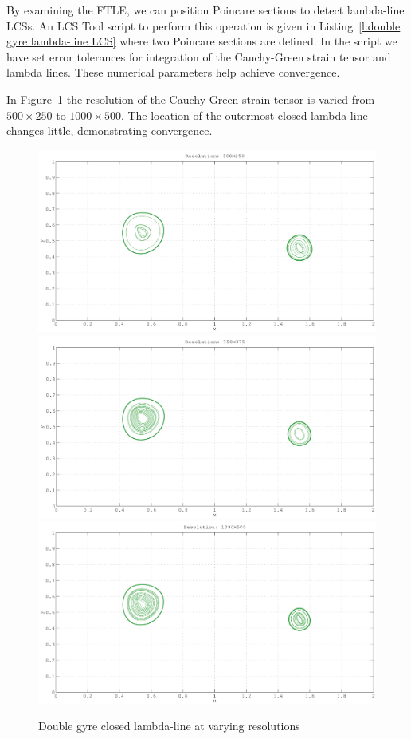 \documentclass{article}
\begin{document}
By examining the FTLE, we can position Poincare sections to detect lambda-line LCSs. An LCS Tool script to perform this operation is given in Listing~\ref{l:double gyre lambda-line LCS} where two Poincare sections are defined. In the script we have set error tolerances for integration of the Cauchy-Green strain tensor and lambda lines. These numerical parameters help achieve convergence.



In Figure~\ref{fig:double_gyre_lambda_lcs_convergence} the resolution of the  Cauchy-Green strain tensor is varied from $500 \times 250$ to $1000 \times 500$. The location of the outermost closed lambda-line changes little, demonstrating convergence.

\begin{figure}[hbt]
  \centering
  \includegraphics[width=.8\textwidth]{graphics/double_gyre/lambda_lcs_convergence_500}
\includegraphics[width=.8\textwidth]{graphics/double_gyre/lambda_lcs_convergence_750}
\includegraphics[width=.8\textwidth]{graphics/double_gyre/lambda_lcs_convergence_1000}
  \caption{Double gyre closed lambda-line at varying resolutions}
  \label{fig:double_gyre_lambda_lcs_convergence}
\end{figure}
\end{document}
